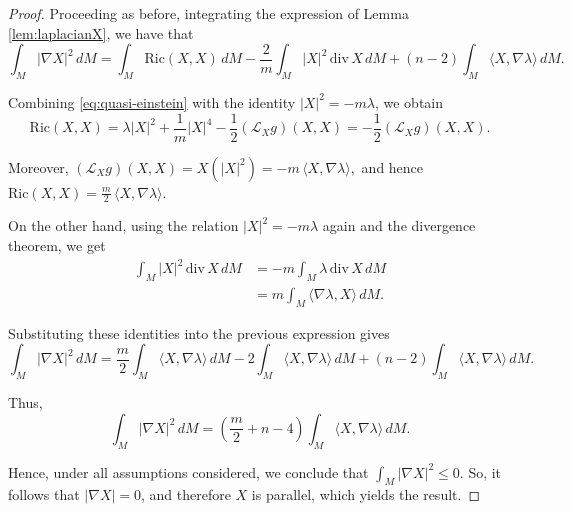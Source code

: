 \documentclass[10pt,a4paper]{amsart}
\begin{document}
\begin{proof}
Proceeding as before, integrating the expression of Lemma \ref{lem:laplacianX}, we have that
\begin{equation*}
\int_M |\nabla X|^2 \, dM
= \int_M \mathrm{Ric}(X,X)\, dM
- \frac{2}{m}\int_M |X|^2 \,\mathrm{div}\,X \, dM
+ (n-2)\int_M \langle X,\nabla \lambda\rangle \, dM.
\end{equation*}

Combining \eqref{eq:quasi-einstein} with the identity $|X|^2 = -m\lambda$, we obtain
\begin{equation*}
\mathrm{Ric}(X,X) = \lambda |X|^2 + \frac{1}{m}|X|^4 
- \frac{1}{2}(\mathcal{L}_X g)(X,X)
= - \frac{1}{2}(\mathcal{L}_X g)(X,X).
\end{equation*}

Moreover,
$ 
(\mathcal{L}_X g)(X,X) = X(|X|^2) = -m\,\langle X,\nabla \lambda\rangle,
$ 
and hence
$ 
\mathrm{Ric}(X,X) = \frac{m}{2}\,\langle X,\nabla \lambda\rangle.
$ 

On the other hand, using the relation $|X|^2 = -m\lambda$  again  and the divergence theorem, we get
\begin{align*}
\int_M |X|^2 \,\mathrm{div}\,X \, dM
&= -m \int_M \lambda \,\mathrm{div}\,X \, dM \\
&= m \int_M \langle \nabla \lambda, X \rangle \, dM.
\end{align*}

Substituting these identities into the previous expression gives
\begin{equation*}
\int_M |\nabla X|^2 \, dM
= \frac{m}{2}\int_M \langle X,\nabla \lambda\rangle \, dM
- 2 \int_M \langle X,\nabla \lambda\rangle \, dM
+ (n-2)\int_M \langle X,\nabla \lambda\rangle \, dM.
\end{equation*}

Thus,
\begin{equation*}
\int_M |\nabla X|^2 \, dM
= \left(\frac{m}{2} + n - 4 \right)
\int_M \langle X,\nabla \lambda\rangle \, dM.
\end{equation*}

Hence, under all assumptions considered, we conclude that
$
\int_M |\nabla X|^2 \leq 0.
$
So, it follows that $|\nabla X|=0$, and therefore $X$ is parallel, which yields the result.
\end{proof}
\end{document}
